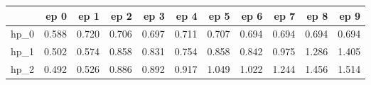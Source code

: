 \begin{tabular}{lrrrrrrrrrr}
\toprule
{} &   ep 0 &   ep 1 &   ep 2 &   ep 3 &   ep 4 &   ep 5 &   ep 6 &   ep 7 &   ep 8 &   ep 9 \\
\midrule
hp\_0 &  0.588 &  0.720 &  0.706 &  0.697 &  0.711 &  0.707 &  0.694 &  0.694 &  0.694 &  0.694 \\
hp\_1 &  0.502 &  0.574 &  0.858 &  0.831 &  0.754 &  0.858 &  0.842 &  0.975 &  1.286 &  1.405 \\
hp\_2 &  0.492 &  0.526 &  0.886 &  0.892 &  0.917 &  1.049 &  1.022 &  1.244 &  1.456 &  1.514 \\
\bottomrule
\end{tabular}
